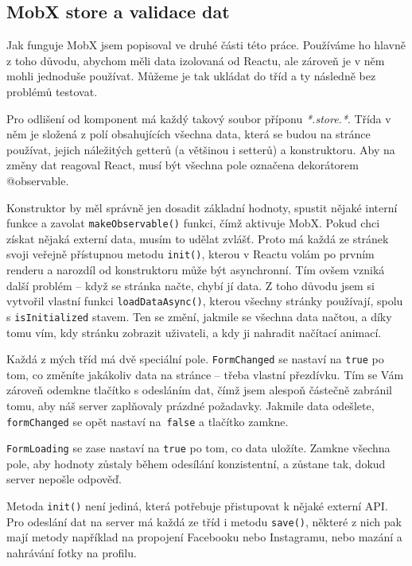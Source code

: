 \subsection{MobX store a validace dat}
Jak funguje MobX jsem popisoval ve druhé části této práce. Používáme ho hlavně z toho důvodu, abychom měli data izolovaná od Reactu, ale zároveň je v něm mohli jednoduše používat. Můžeme je tak ukládat do tříd a ty následně bez problémů testovat.

Pro odlišení od komponent má každý takový soubor příponu \textit{*.store.*}. Třída v něm je složená z polí obsahujících všechna data, která se budou na stránce používat, jejich náležitých getterů (a většinou i setterů) a konstruktoru. Aby na změny dat reagoval React, musí být všechna pole označena dekorátorem @observable.

Konstruktor by měl správně jen dosadit základní hodnoty, spustit nějaké interní funkce a zavolat \texttt{makeObservable()} funkci, čímž aktivuje MobX.
Pokud chci získat nějaká externí data, musím to udělat zvlášť. Proto má každá ze stránek svoji veřejně přístupnou metodu \texttt{init()}, kterou v Reactu volám po prvním renderu a narozdíl od konstruktoru může být asynchronní. Tím ovšem vzniká další problém – když se stránka načte, chybí jí data. Z toho důvodu jsem si vytvořil vlastní funkci \texttt{loadDataAsync()}, kterou všechny stránky používají, spolu s \texttt{isInitialized} stavem. Ten se změní, jakmile se všechna data načtou, a díky tomu vím, kdy stránku zobrazit uživateli, a kdy ji nahradit načítací animací.

Každá z mých tříd má dvě speciální pole. \texttt{FormChanged} se nastaví na \texttt{true} po tom, co změníte jakákoliv data na stránce – třeba vlastní přezdívku. Tím se Vám zároveň odemkne tlačítko s odesláním dat, čímž jsem alespoň částečně zabránil tomu, aby náš server zaplňovaly prázdné požadavky. Jakmile data odešlete, \texttt{formChanged} se opět nastaví na\texttt{ false} a tlačítko zamkne.

\texttt{FormLoading} se zase nastaví na \texttt{true} po tom, co data uložíte. Zamkne všechna pole, aby hodnoty zůstaly během odesílání konzistentní, a zůstane tak, dokud server nepošle odpověď.

Metoda \texttt{init()} není jediná, která potřebuje přistupovat k nějaké externí API. Pro odeslání dat na server má každá ze tříd i metodu \texttt{save()}, některé z nich pak mají metody například na propojení Facebooku nebo Instagramu, nebo mazání a nahrávání fotky na profilu.

